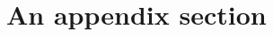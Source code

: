 \documentclass[xelatex,ja=standard]{bxjsarticle}
\title{}
\author{Masashi Yamazaki}
\begin{document}
\maketitle
\tableofcontents

\appendix
\section{An appendix section}
\end{document}
